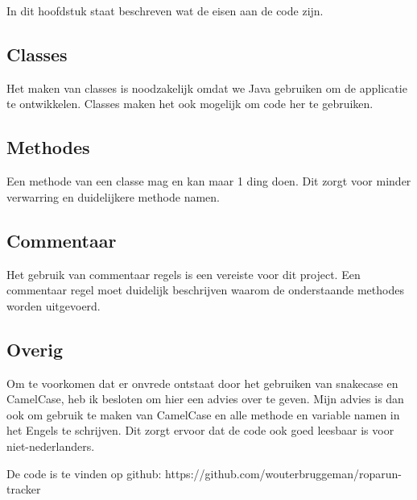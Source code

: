 \documentclass[../main.tex]{subfiles}
\begin{document}
In dit hoofdstuk staat beschreven wat de eisen aan de code zijn.

\subsection{Classes}
Het maken van classes is noodzakelijk omdat we Java gebruiken om de applicatie te ontwikkelen.
Classes maken het ook mogelijk om code her te gebruiken.

\subsection{Methodes}
Een methode van een classe mag en kan maar 1 ding doen.
Dit zorgt voor minder verwarring en duidelijkere methode namen.
\newline

\subsection{Commentaar}
Het gebruik van commentaar regels is een vereiste voor dit project. Een commentaar regel
moet duidelijk beschrijven waarom de onderstaande methodes worden uitgevoerd.
\newline

\subsection{Overig}
Om te voorkomen dat er onvrede ontstaat door het gebruiken van snakecase en CamelCase,
heb ik besloten om hier een advies over te geven.
\newline
Mijn advies is dan ook om gebruik te maken van CamelCase en alle methode en variable
namen in het Engels te schrijven. Dit zorgt ervoor dat de code ook goed leesbaar is voor
niet-nederlanders.

De code is te vinden op github:
https://github.com/wouterbruggeman/roparun-tracker
\end{document}
